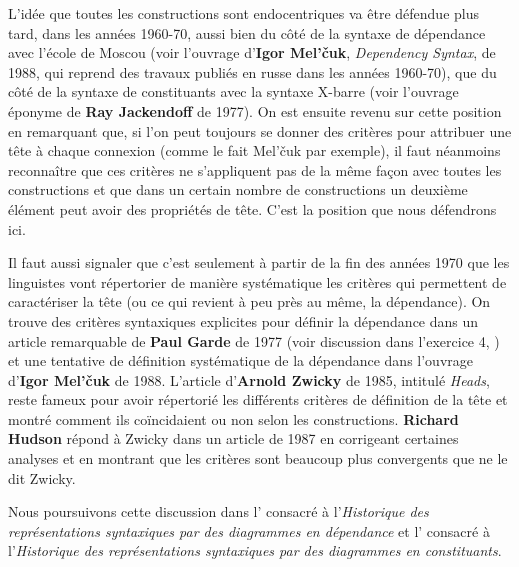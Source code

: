 {    L’idée que toutes les constructions sont endocentriques va être défendue plus tard, dans les années 1960-70, aussi bien du côté de la syntaxe de dépendance avec l’école de Moscou (voir l’ouvrage d’\textbf{Igor Mel’čuk}, \textit{Dependency Syntax}, de 1988, qui reprend des travaux publiés en russe dans les années 1960-70), que du côté de la syntaxe de constituants avec la syntaxe X-barre (voir l’ouvrage éponyme de \textbf{Ray Jackendoff} de 1977). On est ensuite revenu sur cette position en remarquant que, si l’on peut toujours se donner des critères pour attribuer une tête à chaque connexion (comme le fait Mel’čuk par exemple), il faut néanmoins reconnaître que ces critères ne s’appliquent pas de la même façon avec toutes les constructions et que dans un certain nombre de constructions un deuxième élément peut avoir des propriétés de tête. C’est la position que nous défendrons ici.

    Il faut aussi signaler que c’est seulement à partir de la fin des années 1970 que les linguistes vont répertorier de manière systématique les critères qui permettent de caractériser la tête (ou ce qui revient à peu près au même, la dépendance). On trouve des critères syntaxiques explicites pour définir la dépendance dans un article remarquable de \textbf{Paul Garde} de 1977 (voir discussion dans l’exercice 4, ) et une tentative de définition systématique de la dépendance dans l’ouvrage d’\textbf{Igor Mel’čuk} de 1988. L’article d’\textbf{Arnold Zwicky} de 1985, intitulé \textit{Heads}, reste fameux pour avoir répertorié les différents critères de définition de la tête et montré comment ils coïncidaient ou non selon les constructions. \textbf{Richard Hudson} répond à Zwicky dans un article de 1987 en corrigeant certaines analyses et en montrant que les critères sont beaucoup plus convergents que ne le dit Zwicky.

    Nous poursuivons cette discussion dans l’ consacré à l’\textit{Historique des représentations syntaxiques par des diagrammes en dépendance} et l’ consacré à l’\textit{Historique des représentations syntaxiques par des diagrammes en constituants}.
}

